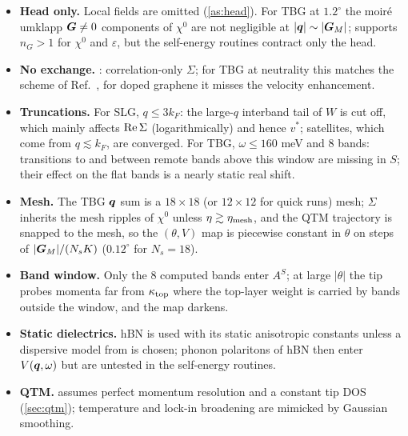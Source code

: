 \begin{itemize}[leftmargin=*]
\item \textbf{Head only.} Local fields are omitted (\cref{as:head}). For TBG at $1.2^\circ$ the moir\'e umklapp
$\bm G\neq0$ components of $\chi^0$ are not negligible at $|\bm q|\sim|\bm G_M|$;  supports $n_G>1$ for
$\chi^0$ and $\varepsilon$, but the self-energy routines contract only the head.
\item \textbf{No exchange.} : correlation-only $\Sigma$; for TBG at neutrality this matches the
scheme of Ref.~\cite{Wei2025}, for doped graphene it misses the velocity enhancement.
\item \textbf{Truncations.} For SLG, $q\le3k_F$: the large-$q$ interband tail of $W$ is cut off, which mainly affects
$\operatorname{Re}\Sigma$ (logarithmically) and hence $v^*$; satellites, which come from $q\lesssim k_F$, are converged. For TBG,
$\omega\le160$ meV and $8$ bands: transitions to and between remote bands above this window are missing in $S$; their
effect on the flat bands is a nearly static real shift.
\item \textbf{Mesh.} The TBG $\bm q$ sum is a $18\times18$ (or $12\times12$ for quick runs) mesh; $\Sigma$ inherits the
mesh ripples of $\chi^0$ unless $\eta\gtrsim\eta_{\rm mesh}$, and the QTM trajectory is snapped to the mesh,
so the $(\theta,V)$ map is piecewise constant in $\theta$ on steps of $|\bm G_M|/(N_sK)$ ($0.12^\circ$ for $N_s=18$).
\item \textbf{Band window.} Only the 8 computed bands enter $A^S$; at large $|\theta|$ the tip probes momenta far from
$\kappa_{\rm top}$ where the top-layer weight is carried by bands outside the window, and the map darkens.
\item \textbf{Static dielectrics.} hBN is used with its static anisotropic constants unless a dispersive model from
 is chosen; phonon polaritons of hBN then enter $V(\bm q,\omega)$ but are untested in the
self-energy routines.
\item \textbf{QTM.}  assumes perfect momentum resolution and a constant tip DOS
(\cref{sec:qtm}); temperature and lock-in broadening are mimicked by Gaussian smoothing.
\end{itemize}
